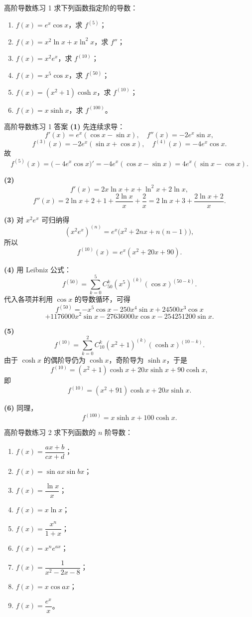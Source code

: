 ﻿\documentclass[aspectratio=169,11pt]{ctexbeamer}
\begin{document}
\begin{frame}{高阶导数练习 1}
\small
求下列函数指定阶的导数：
\begin{enumerate}
\item $f(x)=e^x\cos x$，求 $f^{(5)}$；
\item $f(x)=x^2\ln x+x\ln^2x$，求 $f''$；
\item $f(x)=x^2e^x$，求 $f^{(10)}$；
\item $f(x)=x^5\cos x$，求 $f^{(50)}$；
\item $f(x)=(x^2+1)\cosh x$，求 $f^{(10)}$；
\item $f(x)=x\sinh x$，求 $f^{(100)}$。
\end{enumerate}
\end{frame}

\begin{frame}[allowframebreaks]{高阶导数练习 1 答案}
\small
\textbf{(1)} 先连续求导：
\[
f'(x)=e^x(\cos x-\sin x),\quad
f''(x)=-2e^x\sin x,
\]
\[
f^{(3)}(x)=-2e^x(\sin x+\cos x),\quad
f^{(4)}(x)=-4e^x\cos x.
\]
故
\[
f^{(5)}(x)=\bigl(-4e^x\cos x\bigr)'=-4e^x(\cos x-\sin x)=4e^x(\sin x-\cos x).
\]

\textbf{(2)}
\[
f'(x)=2x\ln x+x+\ln^2x+2\ln x,
\]
\[
f''(x)=2\ln x+2+1+\frac{2\ln x}{x}+\frac2x
=2\ln x+3+\frac{2\ln x+2}{x}.
\]

\textbf{(3)} 对 $x^2e^x$ 可归纳得
\[
(x^2e^x)^{(n)}=e^x\bigl(x^2+2nx+n(n-1)\bigr),
\]
所以
\[
f^{(10)}(x)=e^x(x^2+20x+90).
\]

\textbf{(4)} 用 Leibniz 公式：
\[
f^{(50)}=\sum_{k=0}^5 C_{50}^k (x^5)^{(k)}(\cos x)^{(50-k)}.
\]
代入各项并利用 $\cos x$ 的导数循环，可得
\[
f^{(50)}=-x^5\cos x-250x^4\sin x+24500x^3\cos x
\]
\[
+1176000x^2\sin x-27636000x\cos x-254251200\sin x.
\]

\textbf{(5)}
\[
f^{(10)}=\sum_{k=0}^2 C_{10}^k (x^2+1)^{(k)}(\cosh x)^{(10-k)}.
\]
由于 $\cosh x$ 的偶阶导仍为 $\cosh x$，奇阶导为 $\sinh x$，于是
\[
f^{(10)}=(x^2+1)\cosh x+20x\sinh x+90\cosh x,
\]
即
\[
f^{(10)}=(x^2+91)\cosh x+20x\sinh x.
\]

\textbf{(6)} 同理，
\[
f^{(100)}=x\sinh x+100\cosh x.
\]
\end{frame}

\begin{frame}{高阶导数练习 2}
\small
求下列函数的 $n$ 阶导数：
\begin{enumerate}
\item $f(x)=\dfrac{ax+b}{cx+d}$；
\item $f(x)=\sin ax\sin bx$；
\item $f(x)=\dfrac{\ln x}{x}$；
\item $f(x)=x\ln x$；
\item $f(x)=\dfrac{x^n}{1+x}$；
\item $f(x)=x^ne^{ax}$；
\item $f(x)=\dfrac1{x^2-2x-8}$；
\item $f(x)=x\cos ax$；
\item $f(x)=\dfrac{e^x}{x}$。
\end{enumerate}
\end{frame}
\end{document}
